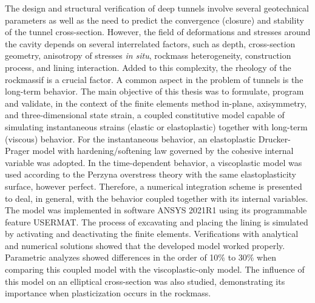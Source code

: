 The design and structural verification of deep tunnels involve several geotechnical parameters as well as the need to predict the convergence (closure) and stability of the tunnel cross-section. However, the field of deformations and stresses around the cavity depends on several interrelated factors, such as depth, cross-section geometry, anisotropy of stresses \textit{in situ}, rockmass heterogeneity, construction process, and lining interaction. Added to this complexity, the rheology of the rockmassif is a crucial factor. A common aspect in the problem of tunnels is the long-term behavior. The main objective of this thesis was to formulate, program and validate, in the context of the finite elements method in-plane, axisymmetry, and three-dimensional state strain, a coupled constitutive model capable of simulating instantaneous strains (elastic or elastoplastic) together with long-term (viscous) behavior. For the instantaneous behavior, an elastoplastic Drucker-Prager model with hardening/softening law governed by the cohesive internal variable was adopted. In the time-dependent behavior, a viscoplastic model was used according to the Perzyna overstress theory with the same elastoplasticity surface, however perfect. Therefore, a numerical integration scheme is presented to deal, in general, with the behavior coupled together with its internal variables. The model was implemented in software ANSYS 2021R1 using its programmable feature USERMAT. The process of excavating and placing the lining is simulated by activating and deactivating the finite elements. Verifications with analytical and numerical solutions showed that the developed model worked properly. Parametric analyzes showed differences in the order of 10\% to 30\% when comparing this coupled model with the viscoplastic-only model. The influence of this model on an elliptical cross-section was also studied, demonstrating its importance when plasticization occurs in the rockmass.